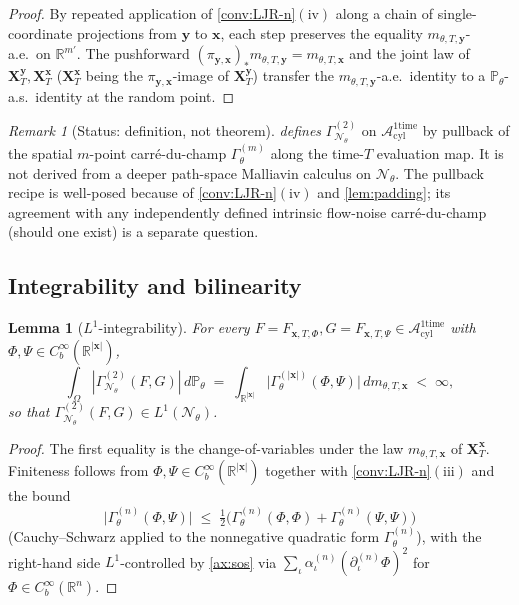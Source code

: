 \documentclass[11pt,reqno]{amsart}
\theoremstyle{plain}
\newtheorem{lemma}[theorem]{Lemma}
\theoremstyle{definition}
\theoremstyle{remark}
\newtheorem{remark}[theorem]{Remark}
\newcommand{\R}{\mathbb R}
\newcommand{\Prob}{\mathbb P}
\newcommand{\cA}{\mathcal A}
\newcommand{\cN}{\mathcal N}
\newcommand{\Aone}{\cA_{\mathrm{cyl}}^{\mathrm{1time}}}
\newcommand{\GamN}{\Gamma^{(2)}_{\cN_{\theta}}}
\newcommand{\GamM}[1]{\Gamma^{(#1)}_{\theta}}
\newcommand{\Pth}{\Prob_{\theta}}
\begin{document}
\begin{proof}
By repeated application of \cref{conv:LJR-n}$(\mathrm{iv})$ along a
chain of single-coordinate projections from $\mathbf y$ to
$\mathbf x$, each step preserves the equality
$m_{\theta,T,\mathbf y}$-a.e.\ on $\R^{m'}$. The pushforward
$(\pi_{\mathbf y,\mathbf x})_{*}m_{\theta,T,\mathbf y}=m_{\theta,T,\mathbf x}$
and the joint law of
$\mathbf X_{T}^{\mathbf y},\mathbf X_{T}^{\mathbf x}$
($\mathbf X_{T}^{\mathbf x}$ being the
$\pi_{\mathbf y,\mathbf x}$-image of $\mathbf X_{T}^{\mathbf y}$)
transfer the $m_{\theta,T,\mathbf y}$-a.e.\ identity to a
$\Pth$-a.s.\ identity at the random point.
\end{proof}

\begin{remark}[Status: definition, not theorem]\label{rem:def-not-thm}
 \emph{defines} $\GamN$ on $\Aone$ by
pullback of the spatial $m$-point carr\'e-du-champ $\GamM{m}$ along
the time-$T$ evaluation map. It is not derived from a deeper
path-space Malliavin calculus on $\cN_{\theta}$. The pullback
recipe is well-posed because of \cref{conv:LJR-n}$(\mathrm{iv})$
and \cref{lem:padding}; its agreement with any independently
defined intrinsic flow-noise carr\'e-du-champ (should one exist)
is a separate question.
\end{remark}

\subsection{Integrability and bilinearity}\label{sec:lifted-integrability}

\begin{lemma}[$L^{1}$-integrability]\label{lem:L1-integrability}
For every $F=F_{\mathbf x,T,\Phi},G=F_{\mathbf x,T,\Psi}\in\Aone$
with $\Phi,\Psi\in C_{b}^{\infty}(\R^{|\mathbf x|})$,
\begin{equation}\label{eq:L1-bound}
  \int_{\Omega}|\GamN(F,G)|\,d\Pth
  \;=\;\int_{\R^{|\mathbf x|}}\bigl|\GamM{|\mathbf x|}(\Phi,\Psi)\bigr|\,dm_{\theta,T,\mathbf x}
  \;<\;\infty,
\end{equation}
so that $\GamN(F,G)\in L^{1}(\cN_{\theta})$.
\end{lemma}

\begin{proof}
The first equality is the change-of-variables under the law
$m_{\theta,T,\mathbf x}$ of $\mathbf X_{T}^{\mathbf x}$. Finiteness
follows from $\Phi,\Psi\in C_{b}^{\infty}(\R^{|\mathbf x|})$
together with \cref{conv:LJR-n}$(\mathrm{iii})$ and the bound
\[
  \bigl|\GamM{n}(\Phi,\Psi)\bigr|
  \;\le\;\tfrac12\bigl(\GamM{n}(\Phi,\Phi)+\GamM{n}(\Psi,\Psi)\bigr)
\]
(Cauchy--Schwarz applied to the nonnegative quadratic form
$\GamM{n}$), with the right-hand side $L^{1}$-controlled by
\cref{ax:sos} via
$\sum_{\iota}\alpha^{(n)}_{\iota}(\partial^{(n)}_{\iota}\Phi)^{2}$
for $\Phi\in C_{b}^{\infty}(\R^{n})$.
\end{proof}
\end{document}

